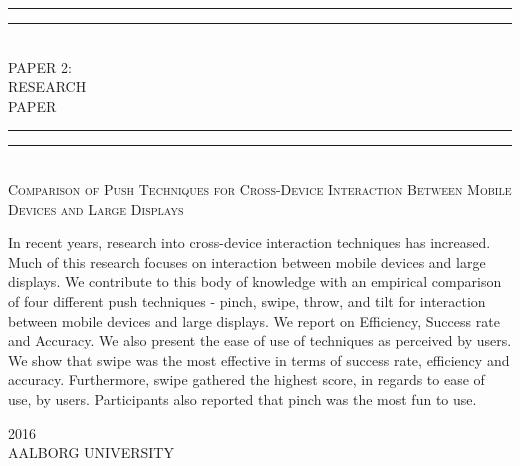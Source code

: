 



\textheight
\centering
\vspace*{\baselineskip}
\rule{\textwidth}{1.6pt}\vspace*{-\baselineskip}\vspace*{2pt}
\rule{\textwidth}{0.4pt}\\[\baselineskip]
{\LARGE PAPER 2: \\ RESEARCH \\[0.3\baselineskip] PAPER}\\[0.2\baselineskip]
\rule{\textwidth}{0.4pt}\vspace*{-\baselineskip}\vspace{3.2pt}
\rule{\textwidth}{1.6pt}\\[\baselineskip]
\scshape
{ \large Comparison of Push Techniques for Cross-Device Interaction Between Mobile Devices and Large Displays } \par
\vspace*{2\baselineskip}
\vspace*{2\baselineskip}
\vspace*{2\baselineskip}
\vspace*{2\baselineskip}



\begin{newab}
	{In recent years, research into cross-device interaction techniques has increased. Much of this research focuses on interaction between mobile devices and large displays. We contribute to this body of knowledge with an empirical comparison of four different push techniques - pinch, swipe, throw,  and tilt for interaction between mobile devices and large displays. We report on Efficiency, Success rate and Accuracy. We also present the ease of use of techniques as perceived by users. We show that swipe was the most effective in terms of success rate, efficiency and accuracy. Furthermore, swipe gathered the highest score, in regards to ease of use, by users. Participants also reported that pinch was the most fun to use.}\par
\end{newab}

	\vspace*{2\baselineskip}
	\vspace*{2\baselineskip}
	\vspace*{2\baselineskip}
	\vspace*{2\baselineskip}
{\scshape 2016} \\
{\large AALBORG UNIVERSITY}\par

